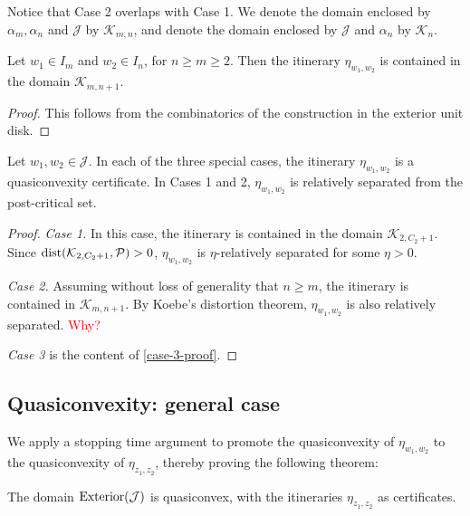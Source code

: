 Notice that Case 2 overlaps with Case 1.
 We denote the domain enclosed by $\alpha_m, \alpha_n$ and $\mathcal J$ by $\mathcal K_{m,n}$, and denote the domain enclosed by $\mathcal J$ and $\alpha_n$ by $\mathcal K_n$.

\begin{lemma}
Let $w_1 \in I_m$ and $w_2 \in I_n$, for $n \geq m \geq 2$. Then the itinerary $\eta_{w_1,w_2}$ is contained in the domain $\mathcal K_{m,n+1}$.
\end{lemma}

\begin{proof}
    This follows from the combinatorics of the construction in the exterior unit disk. 
\end{proof}

\begin{lemma}
\label{case 1 rel. sep}
Let $w_1,w_2 \in \mathcal J$. In each of the three special cases, the itinerary $\eta_{w_1,w_2}$ is a quasiconvexity certificate. In Cases 1 and 2, $\eta_{w_1,w_2}$ is relatively separated from the post-critical set.
\end{lemma}

\begin{proof}
\emph{Case 1.} In this case, the itinerary is contained in the domain $\mathcal K_{2, C_2+1}$.
Since $\operatorname{dist}(\mathcal K_{2, C_2+1}, \mathcal P)>0$, $\eta_{w_1,w_2}$ is $\eta$-relatively separated for some $\eta>0$. 

\emph{Case 2.}
Assuming without loss of generality that $n \geq m$, the itinerary is contained in $\mathcal K_{m,n+1}$. By Koebe's distortion theorem, $\eta_{w_1,w_2}$ is also relatively separated.
{\large \textcolor{red}{Why?}}

\emph{Case 3} is the content of \cref{case-3-proof}.
\end{proof}

\subsection{Quasiconvexity: general case}
We apply a stopping time argument to promote the quasiconvexity of $\eta_{w_1,w_2}$ to the quasiconvexity of $\eta_{z_1,z_2}$, thereby proving the following theorem:

\begin{theorem} \label{quasiconvex-Cauliflower}
	The domain $\operatorname{Exterior}(\mathcal{J})$ is quasiconvex, with the itineraries $\eta_{z_1,z_2}$ as certificates.
\end{theorem}

